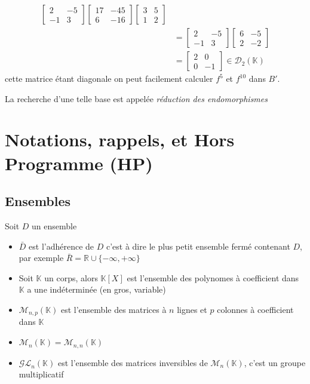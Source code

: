\documentclass[11pt,colorlinks]{book}
\theoremstyle{mytheoremstyle}
\theoremstyle{mytheoremstyle}
\theoremstyle{mytheoremstyle}
\theoremstyle{mytheoremstyle}
\theoremstyle{mytheoremstyle}
\theoremstyle{mytheoremstyle}
\theoremstyle{mytheoremstyle}
\theoremstyle{mytheoremstyle}
\theoremstyle{myproblemstyle}
\def\mbb#1{\mathbb{#1}}
\def\mfc#1{\mathcal{#1}}
\def\bR{\mbb{R}}
\def\bK{\mbb{K}}
\begin{document}
\begin{ex}
\begin{align*}
\begin{bmatrix}
        2 & -5 \\ 
        -1 & 3
       \end{bmatrix} 
       \begin{bmatrix}
        17 & -45 \\ 
        6 & -16 
       \end{bmatrix}
       \begin{bmatrix}
        3 & 5 \\ 
        1 & 2
       \end{bmatrix} \\ 
       &= \begin{bmatrix}
        2 & -5 \\ 
        -1 & 3
       \end{bmatrix} 
       \begin{bmatrix}
        6 & -5 \\ 
        2 & -2
       \end{bmatrix} \\
       &= \begin{bmatrix}
        2 & 0 \\ 
        0 & -1
       \end{bmatrix} \in \mfc{D}_2(\bK)
  \end{align*}
  cette matrice étant diagonale on peut facilement calculer $f^{5}$ et $f^{10}$ dans $B'$.\newline 

  La recherche d'une telle base est appelée \textit{réduction des endomorphismes}
\end{ex}

\chapter{Notations, rappels, et Hors Programme (HP)}
\section{Ensembles}
\begin{rmq}
  Soit $D$ un ensemble
  \begin{itemize}
    \item $\bar{D}$ est l'adhérence de $D$ c'est à dire le plus 
    petit ensemble fermé contenant $D$, par exemple $\bar{R} = \bR \cup \{-\infty,+\infty\}$
    \item Soit $\bK$ un corps, alors $\bK[X]$ est l'ensemble des polynomes 
    à coefficient dans $\bK$ a une indéterminée (en gros, variable)
    \item $\mfc{M}_{n,p}(\bK)$ est l'ensemble des matrices à $n$ lignes et $p$ colonnes à coefficient dans $\bK$
    \item $\mfc{M}_{n}(\bK) = \mfc{M}_{n,n}(\bK)$
    \item $\mfc{GL}_n(\bK)$ est l'ensemble des matrices inversibles de $\mfc{M}_n(\bK)$, c'est un groupe multiplicatif
  \end{itemize}
\end{rmq}
\end{document}
